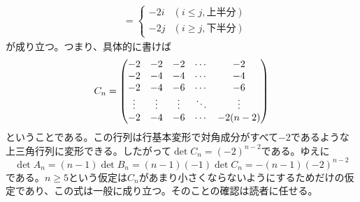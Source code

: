 \begin{sol}
\begin{align*}
    &= \begin{cases}
  -2i &(i \leq j, \text{上半分}) \\
   - 2j &(i \geq j, \text{下半分} )
  \end{cases}
  \end{align*}
  が成り立つ。つまり、具体的に書けば
  \[
  C_n = \begin{pmatrix} 
  -2 & -2 & -2 & \cdots & -2 \\
  -2 & -4 & -4 & \cdots & -4 \\
  -2 & -4 & -6 & \cdots & -6 \\
  \vdots & \vdots & \vdots & \ddots & \vdots \\
 -2 & -4 & -6 & \cdots & -2(n-2)
   \end{pmatrix}
  \]
  ということである。この行列は行基本変形で対角成分がすべて$-2$であるような上三角行列に変形できる。したがって$\det C_n = (-2)^{n-2}$である。ゆえに
  \[
  \det A_n = (n-1) \det B_n = (n-1)(-1) \det C_n = - (n-1) (-2)^{n-2}
  \]
  である。$n \geq 5$という仮定は$C_n$があまり小さくならないようにするためだけの仮定であり、この式は一般に成り立つ。そのことの確認は読者に任せる。
\end{sol}
